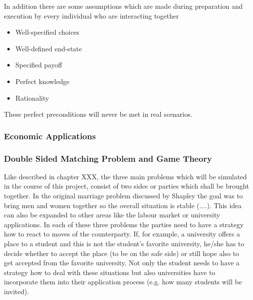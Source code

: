 In addition there are some assumptions which are made during preparation and execution by every individual who are interacting together \cite {gibbons1997gametheory}
\begin{itemize}
	\item Well-specified choices
	\item Well-defined end-state
	\item Specified payoff
	\item Perfect knowledge
	\item Rationality 
\end{itemize}

These perfect preconditions will never be met in real scenarios.

\subsubsection{Economic Applications}

\subsubsection{Double Sided Matching Problem and Game Theory}

Like described in chapter XXX, the three main problems which will be simulated in the course of this project, consist of two sides or parties which shall be brought together. In the original marriage problem discussed by Shapley the goal was to bring men and women together so the overall situation is stable (....). This idea can also be expanded to other areas like the labour market or university applications. In each of these three problems the parties need to have a strategy how to react to moves of the counterparty. If, for example, a university offers a place to a student and this is not the student's favorite university,  he/she has to decide whether to accept the place (to be on the safe side) or still hope also to get accepted from the favorite university. Not only the student needs to have a strategy how to deal with these situations but also universities have to incorporate them into their application process (e.g. how many students will be invited).